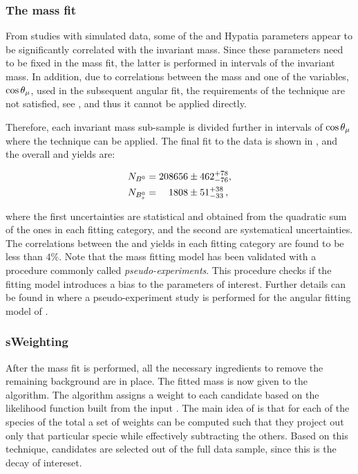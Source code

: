 \subsubsection{The mass fit}
From studies with simulated data, some of the \Bs and \Bd Hypatia parameters appear to be significantly correlated with the \mkpi
invariant mass. Since these parameters need to be fixed in the mass fit, the latter is performed in intervals of the
\mkpi invariant mass. In addition, due to correlations between the mass and one of the variables, $\cos\theta_{\mu}$, used in
the subsequent angular fit, the requirements of the \sPlot technique are not satisfied, see ,
and thus it cannot be applied directly.

Therefore, each \mkpi invariant mass sub-sample is divided further in intervals of $\cos\theta_{\mu}$ where the \sPlot technique
can be applied. The final fit to the data is shown in , and the overall \BsJpsiKst and \BdJpsiKst yields are:

\begin{align}
  \centering
  N_{\Bd} &= 208656  \pm  462 ^{+ 78}_{-76}, \\
  N_{\Bs} &= \phantom{00}1808  \pm  51 ^{+ 38}_{-33} \, ,
  \label{signal_yields}
\end{align}

\noindent where the first uncertainties are statistical and obtained from the quadratic sum of the ones in each fitting category,
and the second are systematical uncertainties. The correlations between the \Bd and \Bs yields in each fitting category
are found to be less than $4\%$. Note that the mass fitting model has been validated with a procedure commonly called {\it pseudo-experiments}.
This procedure checks if the fitting model introduces a bias to the parameters of interest. Further details can be found in
 where a pseudo-experiment study is performed for the angular fitting model of .

\subsubsection{sWeighting}
After the mass fit is performed, all the necessary ingredients to remove the remaining background are in place.
The fitted mass \pdf is now given to the \sPlot algorithm. The algorithm assigns a weight to each candidate
based on the likelihood function built from the input \pdf. The main idea of \sPlot is that for each of the
species of the total \pdf a set of weights can be computed such that they project out only that particular
specie while effectively subtracting the others. Based on this technique, \BsJpsiKst candidates are selected
out of the full data sample, since this is the decay of intereset.

